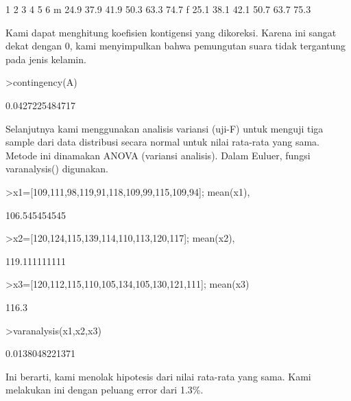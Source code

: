 \documentclass[a4paper,10pt]{article}
\begin{document}
\begin{eulernotebook}
\begin{euleroutput}
             1     2     3     4     5     6
       m  24.9  37.9  41.9  50.3  63.3  74.7
       f  25.1  38.1  42.1  50.7  63.7  75.3
\end{euleroutput}
\begin{eulercomment}
Kami dapat menghitung koefisien kontigensi yang dikoreksi. Karena ini
sangat dekat dengan 0, kami menyimpulkan bahwa pemungutan suara tidak
tergantung pada jenis kelamin.
\end{eulercomment}
\begin{eulerprompt}
>contingency(A)
\end{eulerprompt}
\begin{euleroutput}
  0.0427225484717
\end{euleroutput}
\begin{eulercomment}
\begin{eulercomment}
\begin{eulercomment}
Selanjutnya kami  menggunakan analisis variansi (uji-F) untuk menguji
tiga sample dari data distribusi secara normal untuk nilai rata-rata
yang sama. Metode ini dinamakan ANOVA (variansi analisis). Dalam
Euluer, fungsi varanalysis() digunakan.
\end{eulercomment}
\begin{eulerprompt}
>x1=[109,111,98,119,91,118,109,99,115,109,94]; mean(x1),
\end{eulerprompt}
\begin{euleroutput}
  106.545454545
\end{euleroutput}
\begin{eulerprompt}
>x2=[120,124,115,139,114,110,113,120,117]; mean(x2),
\end{eulerprompt}
\begin{euleroutput}
  119.111111111
\end{euleroutput}
\begin{eulerprompt}
>x3=[120,112,115,110,105,134,105,130,121,111]; mean(x3)
\end{eulerprompt}
\begin{euleroutput}
  116.3
\end{euleroutput}
\begin{eulerprompt}
>varanalysis(x1,x2,x3)
\end{eulerprompt}
\begin{euleroutput}
  0.0138048221371
\end{euleroutput}
\begin{eulercomment}
Ini berarti, kami menolak hipotesis dari nilai rata-rata yang sama.
Kami melakukan ini dengan peluang error dari 1.3\%.


\end{eulercomment}
\end{eulercomment}
\end{eulercomment}
\end{eulernotebook}
\end{document}
